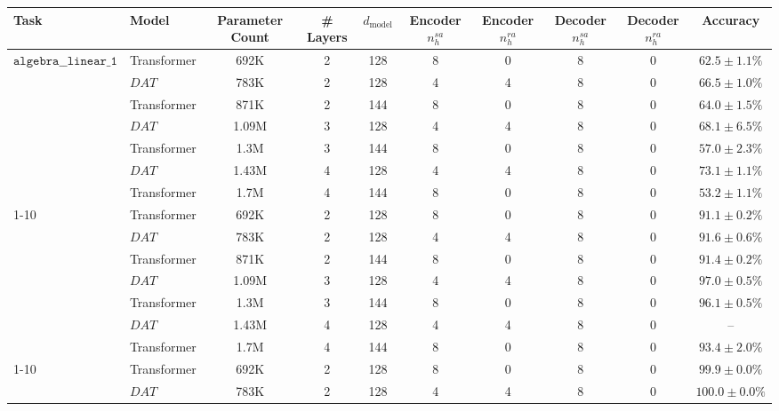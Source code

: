 \begin{tabular}{l|l|ccccccc|c}
\toprule
Task & Model & Parameter Count & \# Layers & $d_{\text{model}}$ & Encoder $n_h^{sa}$ & Encoder $n_h^{ra}$ & Decoder $n_h^{sa}$ & Decoder $n_h^{ra}$ & Accuracy \\
\midrule
\multirow{7}{*}{$\texttt{algebra\_\_linear\_1}$} & Transformer & 692K & 2 & 128 & 8 & 0 & 8 & 0 &   $62.5 \pm 1.1\%$ \\
                                 & $DAT$ & 783K & 2 & 128 & 4 & 4 & 8 & 0 &   $66.5 \pm 1.0\%$ \\
                                 & Transformer & 871K & 2 & 144 & 8 & 0 & 8 & 0 &   $64.0 \pm 1.5\%$ \\
                                 & $DAT$ & 1.09M & 3 & 128 & 4 & 4 & 8 & 0 &   $68.1 \pm 6.5\%$ \\
                                 & Transformer & 1.3M & 3 & 144 & 8 & 0 & 8 & 0 &   $57.0 \pm 2.3\%$ \\
                                 & $DAT$ & 1.43M & 4 & 128 & 4 & 4 & 8 & 0 &   $73.1 \pm 1.1\%$ \\
                                 & Transformer & 1.7M & 4 & 144 & 8 & 0 & 8 & 0 &   $53.2 \pm 1.1\%$ \\
\cline{1-10}
\multirow{7}{*}{$\texttt{algebra\_\_sequence\_next\_term}$} & Transformer & 692K & 2 & 128 & 8 & 0 & 8 & 0 &   $91.1 \pm 0.2\%$ \\
                                 & $DAT$ & 783K & 2 & 128 & 4 & 4 & 8 & 0 &   $91.6 \pm 0.6\%$ \\
                                 & Transformer & 871K & 2 & 144 & 8 & 0 & 8 & 0 &   $91.4 \pm 0.2\%$ \\
                                 & $DAT$ & 1.09M & 3 & 128 & 4 & 4 & 8 & 0 &   $97.0 \pm 0.5\%$ \\
                                 & Transformer & 1.3M & 3 & 144 & 8 & 0 & 8 & 0 &   $96.1 \pm 0.5\%$ \\
                                 & $DAT$ & 1.43M & 4 & 128 & 4 & 4 & 8 & 0 &               -- \\
                                 & Transformer & 1.7M & 4 & 144 & 8 & 0 & 8 & 0 &   $93.4 \pm 2.0\%$ \\
\cline{1-10}
\multirow{7}{*}{$\texttt{calculus\_\_differentiate}$} & Transformer & 692K & 2 & 128 & 8 & 0 & 8 & 0 &   $99.9 \pm 0.0\%$ \\
                                 & $DAT$ & 783K & 2 & 128 & 4 & 4 & 8 & 0 &  $100.0 \pm 0.0\%$ \\

\end{tabular}
